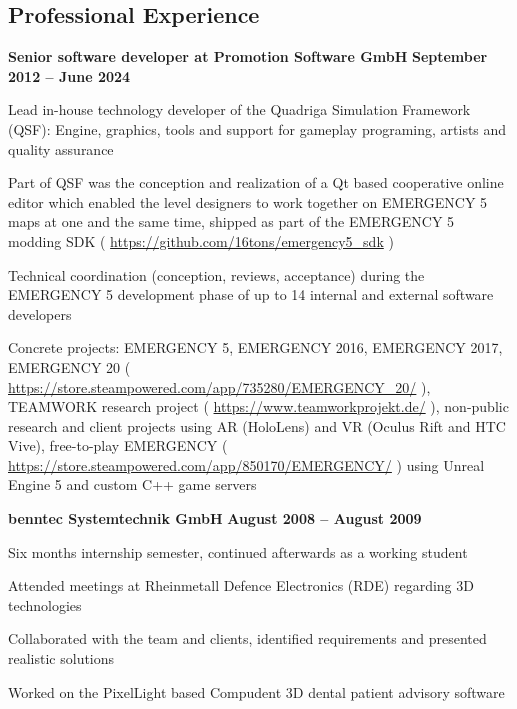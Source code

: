 \documentclass[margin,line]{Ofenberg_Resume}
\begin{document}
\begin{resume}
	\section{\mysidestyle Professional Experience}
	\textbf{Senior software developer at Promotion Software GmbH} \hfill \textbf{September 2012 -- June 2024}\vspace{-3mm}\\\vspace{-1mm}%
	\begin{list2}
		\item Lead in-house technology developer of the Quadriga Simulation Framework (QSF): Engine, graphics, tools and support for gameplay programing, artists and quality assurance
		\item Part of QSF was the conception and realization of a Qt based cooperative online editor which enabled the level designers to work together on EMERGENCY 5 maps at one and the same time, shipped as part of the EMERGENCY 5 modding SDK ( \url{https://github.com/16tons/emergency5_sdk} )
		\item Technical coordination (conception, reviews, acceptance) during the EMERGENCY 5 development phase of up to 14 internal and external software developers
		\item Concrete projects: EMERGENCY 5, EMERGENCY 2016, EMERGENCY 2017, EMERGENCY 20 ( \url{https://store.steampowered.com/app/735280/EMERGENCY_20/} ), TEAMWORK research project ( \url{https://www.teamworkprojekt.de/} ), non-public research and client projects using AR (HoloLens) and VR (Oculus Rift and HTC Vive), free-to-play EMERGENCY ( \url{https://store.steampowered.com/app/850170/EMERGENCY/} ) using Unreal Engine 5 and custom C++ game servers
	\end{list2}\vspace{-1.5mm}
	\textbf{benntec Systemtechnik GmbH} \hfill \textbf{August 2008 -- August 2009}\vspace{-3mm}\\\vspace{-1mm}%
	\begin{list2}
		\item Six months internship semester, continued afterwards as a working student
		\item Attended meetings at Rheinmetall Defence Electronics (RDE) regarding 3D technologies
		\item Collaborated with the team and clients, identified requirements and presented realistic solutions
		\item Worked on the PixelLight based Compudent 3D dental patient advisory software

\end{list2}
\end{resume}
\end{document}
